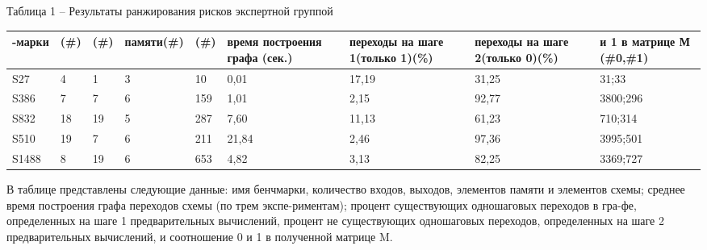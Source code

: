 \documentclass[a4paper, 14pt]{article}
\begin{document}
\begin{center}
    Таблица 1 – Результаты ранжирования рисков экспертной группой
\end{center}
\begin{table}[h]
\centering
\begin{tabular}{|p{1cm}|p{0.8cm}|p{0.8cm}|p{1.1cm}|p{1.1cm}|p{1.5cm}|p{1.7cm}|p{1.7cm}|p{1.6cm}|}
\hline\centering
\fontsize{7}{10}-марки & \centering\fontsize{7}{10}\centering{}\newline(\#) & \centering\fontsize{7}{10}\newline(\#) & \centering\fontsize{7}{10} памяти\newline(\#) & \centering\fontsize{7}{10}\newline(\#) & \centering\fontsize{7}{10} время построения графа (сек.) & \centering\fontsize{7}{10} переходы на шаге 1\newline(только 1)\newline(\%) & \centering\fontsize{7}{10} переходы на шаге 2\newline(только 0)\newline(\%) & \fontsize{7}{10} 0 и 1 в матрице М \newline (\#0,\#1)\\
\hline
S27 & 4 & 1 & 3 & 10 & 0,01 & 17,19 & 31,25 & 31;33 \\
\hline
S386 & 7 & 7 & 6 & 159 & 1,01 & 2,15 & 92,77 & 3800;296 \\
\hline
S832 & 18 & 19 & 5 & 287 & 7,60 & 11,13 & 61,23 & 710;314 \\
\hline
S510 & 19 & 7 & 6 & 211 & 21,84 & 2,46 & 97,36 & 3995;501\\
\hline
S1488 & 8 & 19 & 6 & 653 & 4,82 & 3,13 & 82,25 & 3369;727\\
\hline
\end{tabular}
\end{table}

В таблице представлены следующие данные: имя бенчмарки, количество входов, выходов, элементов памяти и элементов схемы; среднее время построения графа переходов схемы (по трем экспе-риментам); процент существующих одношаговых переходов в гра-фе, определенных на шаге 1 предварительных вычислений, процент не существующих одношаговых переходов, определенных на шаге 2 предварительных вычислений, и соотношение 0 и 1 в полученной матрице M. 
\end{document}

